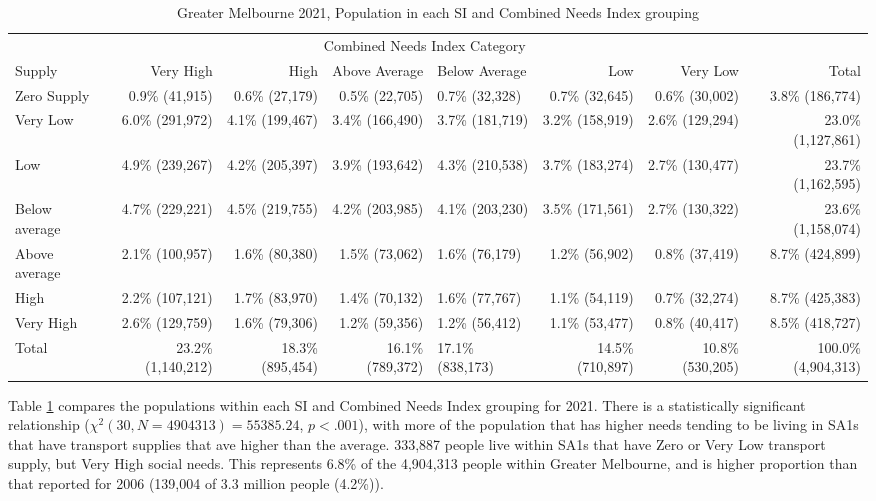 \documentclass[preprint, 3p,
authoryear]{elsarticle} %
\begin{document}
\begin{table}

\caption{\label{tab:Greater_Melbourne_2021_needs_gap_population}Greater Melbourne 2021, Population in each SI and Combined Needs Index grouping}
\centering
\fontsize{6}{8}\selectfont
\begin{tabular}[t]{l|r|r|r|l|r|r|r}
\hline
\multicolumn{1}{c|}{ } & \multicolumn{6}{c|}{Combined Needs Index Category} & \multicolumn{1}{c}{ } \\
\cline{2-7}
Supply & Very High & High & Above Average & Below Average & Low & Very Low & Total\\
\hline
Zero Supply & 0.9\%    (41,915) & 0.6\%  (27,179) & 0.5\%  (22,705) & 0.7\%  (32,328) & 0.7\%  (32,645) & 0.6\%  (30,002) & 3.8\%   (186,774)\\
\hline
Very Low & 6.0\%   (291,972) & 4.1\% (199,467) & 3.4\% (166,490) & 3.7\% (181,719) & 3.2\% (158,919) & 2.6\% (129,294) & 23.0\% (1,127,861)\\
\hline
Low & 4.9\%   (239,267) & 4.2\% (205,397) & 3.9\% (193,642) & 4.3\% (210,538) & 3.7\% (183,274) & 2.7\% (130,477) & 23.7\% (1,162,595)\\
\hline
Below average & 4.7\%   (229,221) & 4.5\% (219,755) & 4.2\% (203,985) & 4.1\% (203,230) & 3.5\% (171,561) & 2.7\% (130,322) & 23.6\% (1,158,074)\\
\hline
Above average & 2.1\%   (100,957) & 1.6\%  (80,380) & 1.5\%  (73,062) & 1.6\%  (76,179) & 1.2\%  (56,902) & 0.8\%  (37,419) & 8.7\%   (424,899)\\
\hline
High & 2.2\%   (107,121) & 1.7\%  (83,970) & 1.4\%  (70,132) & 1.6\%  (77,767) & 1.1\%  (54,119) & 0.7\%  (32,274) & 8.7\%   (425,383)\\
\hline
Very High & 2.6\%   (129,759) & 1.6\%  (79,306) & 1.2\%  (59,356) & 1.2\%  (56,412) & 1.1\%  (53,477) & 0.8\%  (40,417) & 8.5\%   (418,727)\\
\hline
Total & 23.2\% (1,140,212) & 18.3\% (895,454) & 16.1\% (789,372) & 17.1\% (838,173) & 14.5\% (710,897) & 10.8\% (530,205) & 100.0\% (4,904,313)\\
\hline
\end{tabular}
\end{table}

Table \ref{tab:Greater_Melbourne_2021_needs_gap_population} compares the
populations within each SI and Combined Needs Index grouping for 2021.
There is a statistically significant relationship
(\(\chi^2(30, N = 4904313) = 55385.24\), \(p < .001\)), with more of the
population that has higher needs tending to be living in SA1s that have
transport supplies that ave higher than the average. 333,887 people live
within SA1s that have Zero or Very Low transport supply, but Very High
social needs. This represents 6.8\% of the 4,904,313 people within
Greater Melbourne, and is higher proportion than that reported for 2006
(139,004 of 3.3 million people (4.2\%)).
\end{document}
